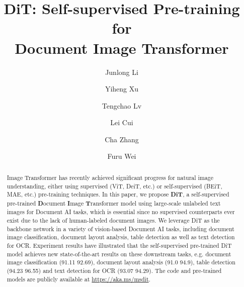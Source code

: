 \documentclass[sigconf]{acmart}
\begin{document}
\fancyhead{}
\title{DiT: Self-supervised Pre-training for \\Document Image Transformer}




\author{Junlong Li}

\author{Yiheng Xu}
\authornotemark[1]



\author{Tengchao Lv}


\author{Lei Cui}

\author{Cha Zhang}


\author{Furu Wei}

\renewcommand{\shortauthors}{Li et.al.}

\begin{abstract}
Image Transformer has recently achieved significant progress for natural image understanding, either using supervised (ViT, DeiT, etc.) or self-supervised (BEiT, MAE, etc.) pre-training techniques. In this paper, we propose \textbf{DiT}, a self-supervised pre-trained \textbf{D}ocument \textbf{I}mage \textbf{T}ransformer model using large-scale unlabeled text images for Document AI tasks, which is essential since no supervised counterparts ever exist due to the lack of human-labeled document images. We leverage DiT as the backbone network in a variety of vision-based Document AI tasks, including document image classification, document layout analysis, table detection as well as text detection for OCR. Experiment results have illustrated that the self-supervised pre-trained DiT model achieves new state-of-the-art results on these downstream tasks, e.g. document image classification (91.11  92.69), document layout analysis (91.0  94.9), table detection (94.23  96.55) and text detection for OCR (93.07  94.29). The code and pre-trained models are publicly available at \url{https://aka.ms/msdit}.
\end{abstract}
\end{document}
